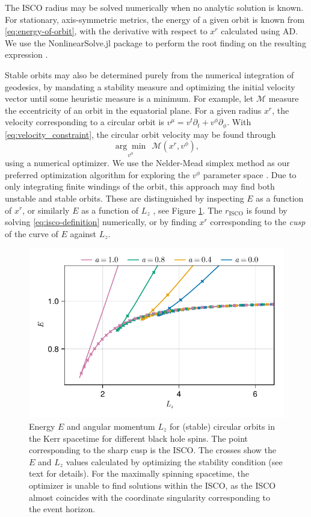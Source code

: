 \documentclass[fleqn,usenatbib]{mnras}
\newcommand{\risco}{r_\text{ISCO}}
\begin{document}
The ISCO radius may be solved numerically when no analytic solution is known.
For stationary, axis-symmetric metrics, the energy of a given orbit is known from
\eqref{eq:energy-of-orbit}, with the derivative with respect to $x^r$
calculated using AD. We use the NonlinearSolve.jl package to perform the root
finding on the resulting expression \citep{Pal_NonlinearSolve_jl_2023}.

Stable orbits may also be determined purely from the numerical integration of
geodesics, by mandating a stability measure and optimizing the initial velocity
vector until some heuristic measure is a minimum. For example, let $\mathscr{M}$
measure the eccentricity of an orbit in the equatorial plane. For a given radius
$x^r$, the velocity corresponding to a circular orbit is $v^\mu = v^t \partial_t
+ v^\phi \partial_\phi $. With \eqref{eq:velocity_constraint}, the circular
orbit velocity may be found through
\begin{equation}
    \underset{v^\phi}{\arg \min}\ \ \mathscr{M}(x^r, v^\phi),
\end{equation}
using a numerical optimizer. We use the Nelder-Mead simplex method as our
preferred optimization algorithm for exploring the $v^\phi$ parameter space
\citep{nelder_simplex_1965}. Due to only integrating finite windings of the
orbit, this approach may find both unstable and stable orbits. These are
distinguished by inspecting $E$ as a function of $x^r$, or similarly $E$ as a
function of $L_z$ \citep{hackmann_charged_2013}, see Figure \ref{fig:e-lz-cusp}.
The $\risco$ is found by solving \eqref{eq:isco-definition} numerically, or
by finding $x^r$ corresponding to the \emph{cusp} of the curve of  $E$ against
$L_z$.

\begin{figure}
    \centering
    \includegraphics[width=0.95\linewidth]{figures/circular-orbits.E-Lz.pdf}
    \caption{Energy $E$ and angular momentum $L_z$ for (stable) circular orbits in the
        Kerr spacetime for different black hole spins. The point corresponding
        to the sharp cusp is the ISCO. The crosses show the $E$ and $L_z$
        values calculated by optimizing the stability condition (see text for
        details). For the maximally spinning spacetime, the optimizer is unable
    to find solutions within the ISCO, as the ISCO almost coincides with the
coordinate singularity corresponding to the event horizon.}
    \label{fig:e-lz-cusp}
\end{figure}
\end{document}
